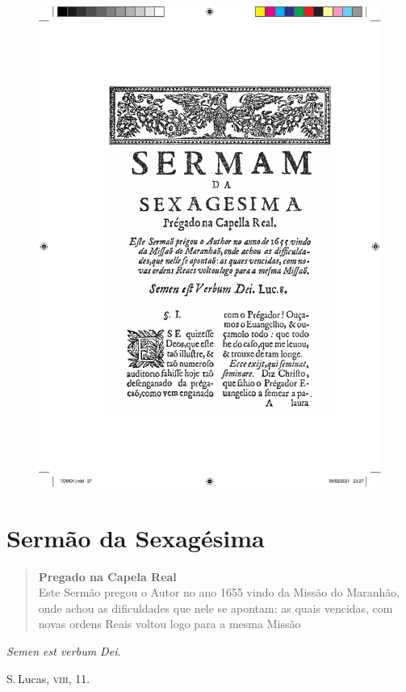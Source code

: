 \pagebreak
\thispagestyle{empty}
\movetoevenpage
\begin{figure}
\includegraphics[width=\textwidth]{./imgs/sexagesima.pdf}  
\end{figure}

\chapter{Sermão da Sexagésima}


\begin{quotation}
\noindent\textbf{Pregado na Capela Real}\\
Este Sermão pregou o Autor no ano 1655 vindo da Missão do Maranhão,
onde achou as dificuldades que nele se apontam: as quais vencidas, com novas ordens Reais voltou logo para a mesma Missão
\end{quotation}


\epigraph{\textit{Semen est verbum Dei.}}{ S.\,Lucas, \textsc{viii}, 11.}

